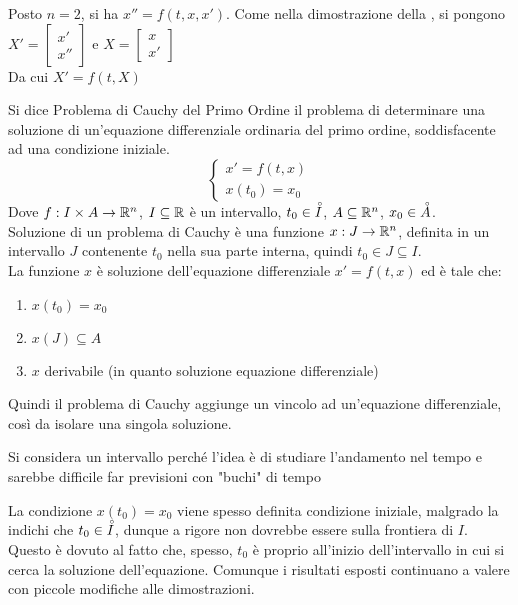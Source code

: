 \begin{example}
	Posto $n=2$, si ha $x''=f(t, x, x')$.
	Come nella dimostrazione della , si pongono $X'= \begin{bmatrix} x'\\ x'' \end{bmatrix}$ e $X=\begin{bmatrix}x\\ x'\end{bmatrix}$\\
	Da cui $X'=f(t,X)$
\end{example}

\begin{definition}
	\label{def:prob_cauchy_ord_1}
	Si dice Problema di Cauchy del Primo Ordine il problema di determinare una soluzione di un'equazione differenziale ordinaria del primo ordine, soddisfacente ad una condizione iniziale.
	$$\begin{cases}x'=f(t,x)\\x(t_0)=x_0\end{cases}$$
	Dove $f:I\times A\to \mathbb{R}^n$, $I\subseteq \mathbb{R}$ è un intervallo, $t_0\in\accentset{\circ}{I}$, $A\subseteq \mathbb{R}^n$, $x_0\in\accentset{\circ}{A}$.\\
	Soluzione di un problema di Cauchy è una funzione $x:J\to \mathbb{R}^n$, definita in un intervallo $J$ contenente $t_0$ nella sua parte interna, quindi $t_0\in J\subseteq I$.\\
	La funzione $x$ è soluzione dell'equazione differenziale $x'=f(t,x)$ ed è tale che:
	\begin{enumerate}
		\item $x(t_0)=x_0$
		\item $x(J)\subseteq A$
		\item $x$ derivabile (in quanto soluzione equazione differenziale)
	\end{enumerate}
	Quindi il problema di Cauchy aggiunge un vincolo ad un'equazione differenziale, così da isolare una singola soluzione.
\end{definition}
\begin{note}
	Si considera un intervallo perché l'idea è di studiare l'andamento nel tempo e sarebbe difficile far previsioni con "buchi" di tempo
\end{note}
\begin{note}
	La condizione $x(t_0) = x_0$ viene spesso definita condizione iniziale, malgrado la  indichi che $t_0 \in \accentset{\circ}{I}$, dunque a rigore non dovrebbe essere sulla frontiera di $I$. Questo è dovuto al fatto che, spesso, $t_0$ è proprio all'inizio dell'intervallo in cui si cerca la soluzione dell'equazione.\newline
	Comunque i risultati esposti continuano a valere con piccole modifiche alle dimostrazioni.
\end{note}

